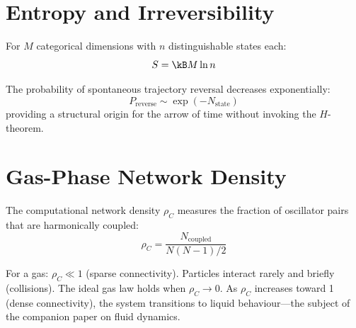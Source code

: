 \section{Entropy and Irreversibility}
\label{sec:entropy}

\begin{theorem}
For $M$ categorical dimensions with $n$ distinguishable states each:
\begin{equation}
    S = \kB M \ln n
\end{equation}
\end{theorem}

\begin{theorem}
The probability of spontaneous trajectory reversal decreases exponentially:
\begin{equation}
    P_{\mathrm{reverse}} \sim \exp(-N_{\mathrm{state}})
\end{equation}
providing a structural origin for the arrow of time without invoking the $H$-theorem.
\end{theorem}

\section{Gas-Phase Network Density}
\label{sec:network_density}

\begin{definition}
The computational network density $\rho_C$ measures the fraction of oscillator pairs that are harmonically coupled:
\begin{equation}
    \rho_C = \frac{N_{\mathrm{coupled}}}{N(N-1)/2}
\end{equation}
\end{definition}

For a gas: $\rho_C \ll 1$ (sparse connectivity). Particles interact rarely and briefly (collisions). The ideal gas law holds when $\rho_C \to 0$. As $\rho_C$ increases toward 1 (dense connectivity), the system transitions to liquid behaviour---the subject of the companion paper on fluid dynamics.

